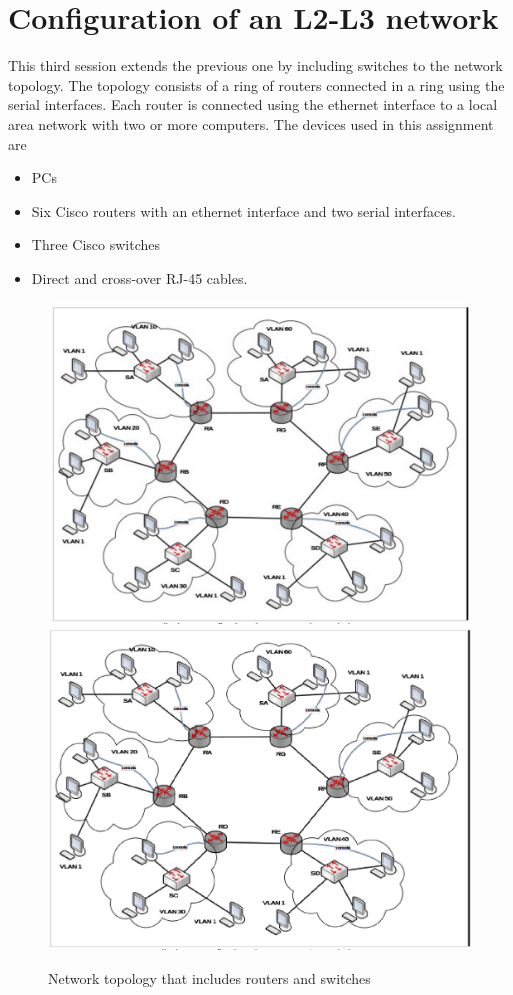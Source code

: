 \section{Configuration of an L2-L3 network}
This third session extends the previous one by including switches to the network topology.
The topology consists of a ring of routers connected in a ring using the serial interfaces.
Each router is connected using the ethernet interface to a local area network with two or more computers.
The devices used in this assignment are
\begin{itemize}
\item PCs
\item Six Cisco routers with an ethernet interface and two serial interfaces.
\item Three Cisco switches
\item Direct and cross-over RJ-45 cables.
\end{itemize}

\begin{figure}
\centering
\ifpdf
\includegraphics[width=0.9\linewidth]{Figures/routers_and_switches.pdf}
\else
\includegraphics[width=0.9\linewidth]{Figures/routers_and_switches.eps}
\fi
\caption{Network topology that includes routers and switches}
\label{fig:StpTopology}
\end{figure}

